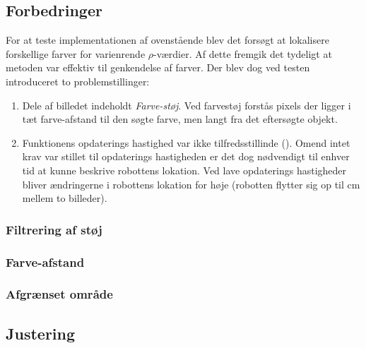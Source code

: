 \subsection{Forbedringer}
For at teste implementationen af ovenstående blev det forsøgt at lokalisere forskellige farver for varienrende $\rho$-værdier.
Af dette fremgik det tydeligt at metoden var effektiv til genkendelse af farver.
Der blev dog ved testen introduceret to problemstillinger:
\begin{enumerate}
\item Dele af billedet indeholdt \emph{Farve-støj}.
Ved farvestøj forstås pixels der ligger i tæt farve-afstand til den søgte farve, men langt fra det eftersøgte objekt.
\item Funktionens opdaterings hastighed var ikke tilfredsstillinde ().
Omend intet krav var stillet til opdaterings hastigheden er det dog nødvendigt til enhver tid at kunne beskrive robottens lokation.
Ved lave opdaterings hastigheder bliver ændringerne i robottens lokation for høje (robotten flytter sig op til  cm mellem to billeder).
\end{enumerate}


\subsubsection{Filtrering af støj}

\subsubsection{Farve-afstand}

\subsubsection{Afgrænset område}

\subsection{Justering}\label{tracking:adjust}
